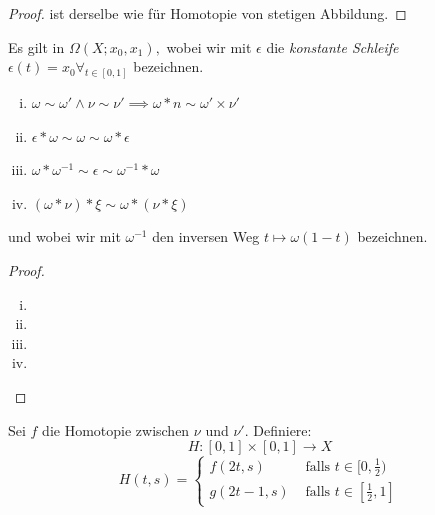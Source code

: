 \documentclass[a4paper,10pt]{scrartcl}
\begin{document}
\begin{proof}
 ist derselbe wie für Homotopie von stetigen Abbildung.
\end{proof}
\begin{lem}
 Es gilt in $\Omega(X;x_0,x_1),$ wobei wir mit $\epsilon$ die \emph{konstante Schleife} 
$\epsilon(t)=x_0 \forall_{t\in [0,1]}$ bezeichnen.
\begin{enumerate}[(i)]
 \item $\omega \sim \omega' \land \nu \sim \nu' \implies \omega *n \sim \omega'\times \nu'$
  \item $\epsilon * \omega \sim \omega \sim \omega* \epsilon$ 
\item $\omega * \omega^{-1} \sim \epsilon \sim \omega^{-1}*\omega$
 \item $(\omega * \nu)*\xi \sim \omega*(\nu * \xi)$
\end{enumerate}
und wobei wir mit $\omega^{-1}$ den inversen Weg $t\mapsto \omega(1-t)$ bezeichnen.
\end{lem}
\begin{proof}\fixme[fig51]
\begin{enumerate}[(i)]
\item \fixme[fig52]
\item \fixme[fig53]
\item \fixme[fig54]
\item \fixme[fig55]
\end{enumerate}
\end{proof}
\begin{note*}
Sei $f$ die Homotopie zwischen $\nu$ und $ \nu'$. Definiere:
\[
 H:[0,1]\times[0,1]\to X
\]
\[
 H(t,s)=\begin{cases} f(2t, s) &\text{ falls } t\in [0, \frac{1}{2}) \\ g(2t-1,s) &\text{ falls } t\in [\frac{1}{2}, 1] \end{cases}
\]
\end{note*}
\end{document}
